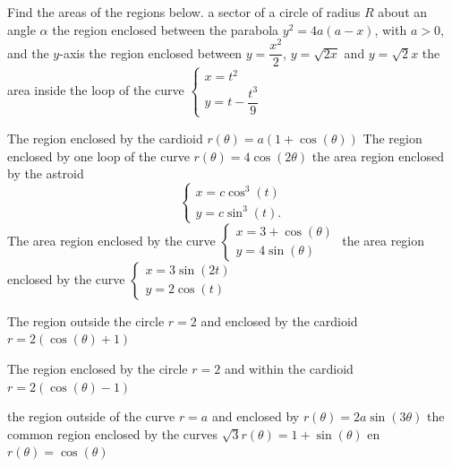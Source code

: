 \begin{Exercise} Find the areas of the regions below.
\ifcalculus
\Question[difficulty = 1] a sector of a circle of radius $R$ about an angle $\alpha$
\Question[difficulty = 1] the region enclosed between the parabola $y^2=4a(a-x)$, with $a>0$, and the $y$-axis
\Question[difficulty = 1] the region enclosed between $y=\dfrac{x^2}{2}$, $y = \sqrt{2x}$ and $y = \sqrt{2} x$
\fi
\ifanalysis\Question[difficulty = 1]\fi\ifcalculus\Question[difficulty = 2]\fi the area inside the loop of the curve $\left\{ \begin{array}{l} x = t^2 \\ y = t- \dfrac{t^3}{9}   \end{array}  \right.$

\ifcalculus
\Question[difficulty = 2] The  region enclosed by  the cardioid $r(\theta) = a(1+ \cos(\theta))$
\Question[difficulty = 2] The  region enclosed by one loop of the curve $r(\theta) = 4 \cos(2 \theta) $
\Question[difficulty = 2] the area  region enclosed by  the astroid
\[ \left \{\begin{array}{l}
x = c \cos^3 (t)\\
y = c \sin^3 (t) .
\end{array}\right. \] 
\ifanalysis\Question[difficulty = 2]\fi\ifcalculus\Question[difficulty = 3]\fi The area  region enclosed by  the curve $\left\{\begin{array}{l} x = 3 + \cos(\theta) \\ y = 4 \sin(\theta)   \end{array} \right.$ 
\ifanalysis\Question[difficulty = 2]\fi\ifcalculus\Question[difficulty = 3]\fi the area  region enclosed by  the curve $\left\{ \begin{array}{l} x = 3 \sin(2t) \\ y = 2 \cos(t)  \end{array}  \right.$ 

\Question[difficulty = 2] The region outside the circle $r=2$ and  enclosed by  the cardioid $r = 2 \left( \cos(\theta) + 1 \right)$

\Question[difficulty = 2] The  region enclosed by  the circle $r=2$ and within the cardioid $r = 2 \left( \cos(\theta) - 1 \right)$

\Question[difficulty = 3] the region outside of the curve $r=a$ and   enclosed by  $r(\theta)=2a \sin(3 \theta)$
\Question[difficulty = 3] the common region enclosed by the curves $\sqrt{3} r(\theta)= 1+\sin(\theta)$ en $ r(\theta) = \cos(\theta)$
\fi



\end{Exercise}
